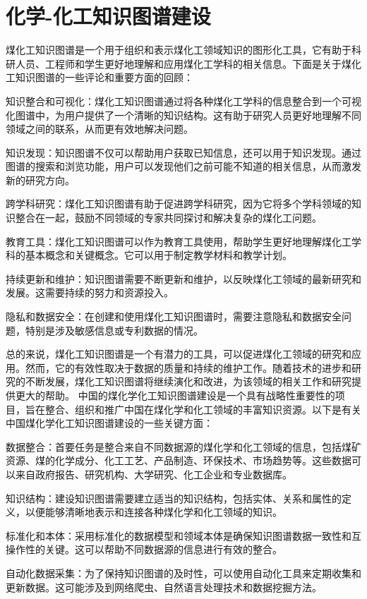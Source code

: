 \section{化学-化工知识图谱建设}
煤化工知识图谱是一个用于组织和表示煤化工领域知识的图形化工具，它有助于科研人员、工程师和学生更好地理解和应用煤化工学科的相关信息。下面是关于煤化工知识图谱的一些评论和重要方面的回顾：

知识整合和可视化：煤化工知识图谱通过将各种煤化工学科的信息整合到一个可视化图谱中，为用户提供了一个清晰的知识结构。这有助于研究人员更好地理解不同领域之间的联系，从而更有效地解决问题。

知识发现：知识图谱不仅可以帮助用户获取已知信息，还可以用于知识发现。通过图谱的搜索和浏览功能，用户可以发现他们之前可能不知道的相关信息，从而激发新的研究方向。

跨学科研究：煤化工知识图谱有助于促进跨学科研究，因为它将多个学科领域的知识整合在一起，鼓励不同领域的专家共同探讨和解决复杂的煤化工问题。

教育工具：煤化工知识图谱可以作为教育工具使用，帮助学生更好地理解煤化工学科的基本概念和关键概念。它可以用于制定教学材料和教学计划。

持续更新和维护：知识图谱需要不断更新和维护，以反映煤化工领域的最新研究和发展。这需要持续的努力和资源投入。

隐私和数据安全：在创建和使用煤化工知识图谱时，需要注意隐私和数据安全问题，特别是涉及敏感信息或专利数据的情况。

总的来说，煤化工知识图谱是一个有潜力的工具，可以促进煤化工领域的研究和应用。然而，它的有效性取决于数据的质量和持续的维护工作。随着技术的进步和研究的不断发展，煤化工知识图谱将继续演化和改进，为该领域的相关工作和研究提供更大的帮助。
中国的煤化学化工知识图谱建设是一个具有战略性重要性的项目，旨在整合、组织和推广中国在煤化学和化工领域的丰富知识资源。以下是有关中国煤化学化工知识图谱建设的一些关键方面：

数据整合：首要任务是整合来自不同数据源的煤化学和化工领域的信息，包括煤矿资源、煤的化学成分、化工工艺、产品制造、环保技术、市场趋势等。这些数据可以来自政府报告、研究机构、大学研究、化工企业和专业数据库。

知识结构：建设知识图谱需要建立适当的知识结构，包括实体、关系和属性的定义，以便能够清晰地表示和连接各种煤化学和化工领域的知识。

标准化和本体：采用标准化的数据模型和领域本体是确保知识图谱数据一致性和互操作性的关键。这可以帮助不同数据源的信息进行有效的整合。

自动化数据采集：为了保持知识图谱的及时性，可以使用自动化工具来定期收集和更新数据。这可能涉及到网络爬虫、自然语言处理技术和数据挖掘方法。

